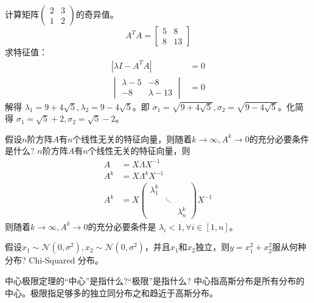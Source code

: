 \begin{problem}
	计算矩阵$\begin{pmatrix}2&3\\1&2\end{pmatrix}$的奇异值。
	\solution \[A^TA = \begin{bmatrix}
		5 & 8 \\
		8 & 13
	\end{bmatrix}\]
	求特征值：\begin{align*}
		|\lambda I - A^TA| &= 0\\
		\begin{vmatrix}
			\lambda - 5 & -8 \\
			-8 & \lambda - 13
		\end{vmatrix} &= 0
	\end{align*}
	解得 $\lambda_1 = 9 + 4\sqrt{5}, \lambda_2 = 9 - 4\sqrt{5}$。即 $\sigma_1 = \sqrt{9 + 4\sqrt{5}}, \sigma_2 = \sqrt{9 - 4\sqrt{5}}$。化简得 $\sigma_1 = \sqrt{5} + 2, \sigma_2 = \sqrt{5} - 2$。
\end{problem}

\begin{problem}
	假设$n$阶方阵$A$有$n$个线性无关的特征向量，则随着$k\to \infty,A^k\to 0$的充分必要条件是什么?
	\solution $n$阶方阵$A$有$n$个线性无关的特征向量，则 $$\begin{aligned}
		A &= X\Lambda X^{-1} \\	
		A^k &= X \Lambda^k X^{-1}\\
		A^k &= X \begin{pmatrix}  
			\lambda_1^k &  &  \\  
			 & \ddots & \\  
			 &  & \lambda_n^k  
		\end{pmatrix} X^{-1} 
	\end{aligned}$$
	则随着$k\to \infty,A^k\to 0$的充分必要条件是 $\lambda_i < 1,\forall i\in [1, n]$。
\end{problem}

\begin{problem}
	假设$x_1\sim \mathcal{N}(0,\sigma^2),x_2\sim\mathcal{N}(0,\sigma^2)$，并且$x_1$和$x_2$独立，则$y=x_1^2+x_2^2$服从何种分布?
	\solution Chi-Squared 分布。
\end{problem}

\begin{problem}
	中心极限定理的“中心”是指什么?“极限”是指什么? 
	\solution 中心指高斯分布是所有分布的中心。极限指足够多的独立同分布之和趋近于高斯分布。
\end{problem}

